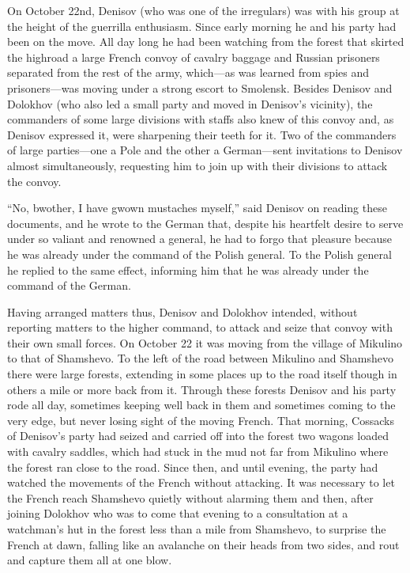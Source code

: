 On October 22nd, Denisov (who was one of the irregulars) was with
his group at the height of the guerrilla enthusiasm. Since early
morning he and his party had been on the move. All day long he
had been watching from the forest that skirted the highroad a
large French convoy of cavalry baggage and Russian prisoners
separated from the rest of the army, which---as was learned from
spies and prisoners---was moving under a strong escort to
Smolensk. Besides Denisov and Dolokhov (who also led a small
party and moved in Denisov's vicinity), the commanders of some
large divisions with staffs also knew of this convoy and, as
Denisov expressed it, were sharpening their teeth for it. Two of
the commanders of large parties---one a Pole and the other a
German---sent invitations to Denisov almost simultaneously,
requesting him to join up with their divisions to attack the
convoy.

``No, bwother, I have gwown mustaches myself,'' said Denisov on
reading these documents, and he wrote to the German that, despite
his heartfelt desire to serve under so valiant and renowned a
general, he had to forgo that pleasure because he was already
under the command of the Polish general. To the Polish general he
replied to the same effect, informing him that he was already
under the command of the German.

Having arranged matters thus, Denisov and Dolokhov intended,
without reporting matters to the higher command, to attack and
seize that convoy with their own small forces. On October 22 it
was moving from the village of Mikulino to that of Shamshevo. To
the left of the road between Mikulino and Shamshevo there were
large forests, extending in some places up to the road itself
though in others a mile or more back from it. Through these
forests Denisov and his party rode all day, sometimes keeping
well back in them and sometimes coming to the very edge, but
never losing sight of the moving French. That morning, Cossacks
of Denisov's party had seized and carried off into the forest two
wagons loaded with cavalry saddles, which had stuck in the mud
not far from Mikulino where the forest ran close to the
road. Since then, and until evening, the party had watched the
movements of the French without attacking. It was necessary to
let the French reach Shamshevo quietly without alarming them and
then, after joining Dolokhov who was to come that evening to a
consultation at a watchman's hut in the forest less than a mile
from Shamshevo, to surprise the French at dawn, falling like an
avalanche on their heads from two sides, and rout and capture
them all at one blow.

